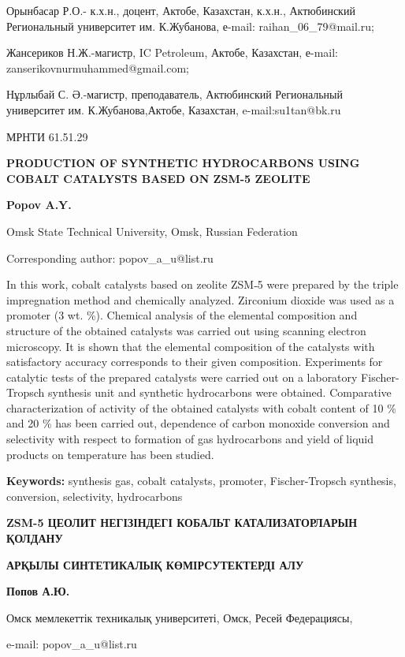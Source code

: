 Орынбасар Р.О.- к.х.н., доцент, Актобе, Казахстан, к.х.н., Актюбинский
Региональный университет им. К.Жубанова, е-mail: raihan\_06\_79@mail.ru;

Жансериков Н.Ж.-магистр, IC Petroleum, Актобе, Казахстан, е-mail:
zanserikovnurmuhammed@gmail.com;

Нұрлыбай С. Ә.-магистр, преподаватель, Актюбинский Региональный
университет им. К.Жубанова,Актобе, Казахстан, e-mail:su1tan@bk.ru

МРНТИ 61.51.29

\textbf{PRODUCTION OF SYNTHETIC HYDROCARBONS USING COBALT CATALYSTS
BASED ON ZSM-5 ZEOLITE}

\textbf{Popov A.Y.}

Omsk State Technical University, Omsk, Russian Federation

Corresponding author: popov\_a\_u@list.ru

In this work, cobalt catalysts based on zeolite ZSM˗5 were prepared by
the triple impregnation method and chemically analyzed. Zirconium
dioxide was used as a promoter (3 wt. \%). Chemical analysis of the
elemental composition and structure of the obtained catalysts was
carried out using scanning electron microscopy. It is shown that the
elemental composition of the catalysts with satisfactory accuracy
corresponds to their given composition. Experiments for catalytic tests
of the prepared catalysts were carried out on a laboratory
Fischer-Tropsch synthesis unit and synthetic hydrocarbons were obtained.
Comparative characterization of activity of the obtained catalysts with
cobalt content of 10 \% and 20 \% has been carried out, dependence of
carbon monoxide conversion and selectivity with respect to formation of
gas hydrocarbons and yield of liquid products on temperature has been
studied.

\textbf{Keywords:} synthesis gas, cobalt catalysts, promoter,
Fischer-Tropsch synthesis, conversion, selectivity, hydrocarbons

\textbf{ZSM-5 ЦЕОЛИТ НЕГІЗІНДЕГІ КОБАЛЬТ КАТАЛИЗАТОРЛАРЫН ҚОЛДАНУ}

\textbf{АРҚЫЛЫ СИНТЕТИКАЛЫҚ КӨМІРСУТЕКТЕРДІ АЛУ}

\textbf{Попов А.Ю.}

Омск мемлекеттік техникалық университеті, Омск, Ресей Федерациясы,

e-mail: popov\_a\_u@list.ru

